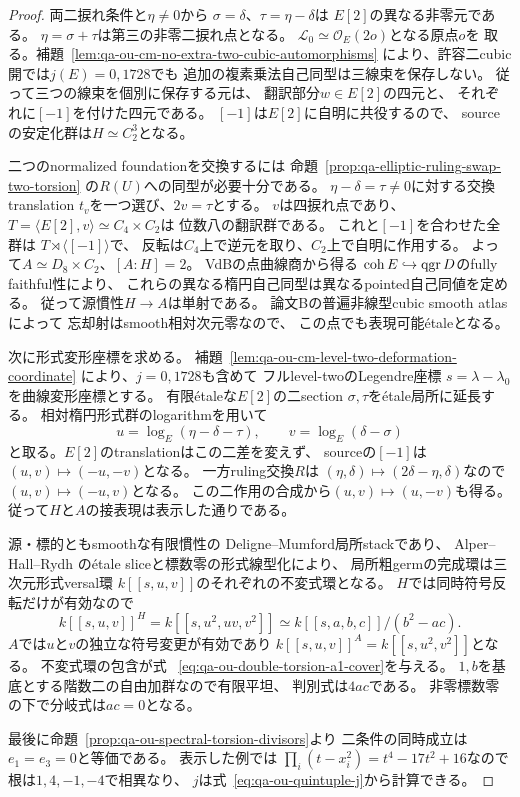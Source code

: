 \begin{proof}
両二捩れ条件と$\eta\ne0$から
$\sigma=\delta$、$\tau=\eta-\delta$は
$E[2]$の異なる非零元である。
$\eta=\sigma+\tau$は第三の非零二捩れ点となる。
$\mathcal L_0\simeq\mathcal O_E(2o)$となる原点$o$を
取る。補題~\ref{lem:qa-ou-cm-no-extra-two-cubic-automorphisms}
により、許容二cubic開では$j(E)=0,1728$でも
追加の複素乗法自己同型は三線束を保存しない。
従って三つの線束を個別に保存する元は、
翻訳部分$w\in E[2]$の四元と、
それぞれに$[-1]$を付けた四元である。
$[-1]$は$E[2]$に自明に共役するので、
sourceの安定化群は$H\simeq C_2^3$となる。

二つのnormalized foundationを交換するには
命題~\ref{prop:qa-elliptic-ruling-swap-two-torsion}
の$R(U)$への同型が必要十分である。
$\eta-\delta=\tau\ne0$に対する交換translation
$t_v$を一つ選び、$2v=\tau$とする。
$v$は四捩れ点であり、
$T=\langle E[2],v\rangle\simeq C_4\times C_2$は
位数八の翻訳群である。
これと$[-1]$を合わせた全群は
$T\rtimes\langle[-1]\rangle$で、
反転は$C_4$上で逆元を取り、$C_2$上で自明に作用する。
よって$A\simeq D_8\times C_2$、$[A:H]=2$。
VdBの点曲線商から得る
$\operatorname{coh} E\hookrightarrow\operatorname{qgr} D$のfully faithful性により、
これらの異なる楕円自己同型は異なるpointed自己同値を定める。
従って源慣性$H\to A$は単射である。
論文Bの普遍非線型cubic smooth atlasによって
忘却射はsmooth相対次元零なので、
この点でも表現可能étaleとなる。

次に形式変形座標を求める。
補題~\ref{lem:qa-ou-cm-level-two-deformation-coordinate}
により、$j=0,1728$も含めて
フルlevel-twoのLegendre座標
$s=\lambda-\lambda_0$を曲線変形座標とする。
有限étaleな$E[2]$の二section
$\sigma,\tau$をétale局所に延長する。
相対楕円形式群のlogarithmを用いて
\[
 u=\log_E(\eta-\delta-\tau),\qquad
 v=\log_E(\delta-\sigma)
\]
と取る。$E[2]$のtranslationはこの二差を変えず、
sourceの$[-1]$は$(u,v)\mapsto(-u,-v)$となる。
一方ruling交換$R$は
$(\eta,\delta)\mapsto(2\delta-\eta,\delta)$なので
$(u,v)\mapsto(-u,v)$となる。
この二作用の合成から$(u,v)\mapsto(u,-v)$も得る。
従って$H$と$A$の接表現は表示した通りである。

源・標的ともsmoothな有限慣性の
Deligne--Mumford局所stackであり、
Alper--Hall--Rydh
\cite[Theorem 1.2]{AlperHallRydh2020}
のétale sliceと標数零の形式線型化により、
局所粗germの完成環は三次元形式versal環
$k[[s,u,v]]$のそれぞれの不変式環となる。
$H$では同時符号反転だけが有効なので
\[
 k[[s,u,v]]^H
   =k[[s,u^2,uv,v^2]]
   \simeq k[[s,a,b,c]]/(b^2-ac).
\]
$A$では$u$と$v$の独立な符号変更が有効であり
$k[[s,u,v]]^A=k[[s,u^2,v^2]]$となる。
不変式環の包含が式
~\eqref{eq:qa-ou-double-torsion-a1-cover}を与える。
$1,b$を基底とする階数二の自由加群なので有限平坦、
判別式は$4ac$である。
非零標数零の下で分岐式は$ac=0$となる。

最後に命題~\ref{prop:qa-ou-spectral-torsion-divisors}より
二条件の同時成立は$e_1=e_3=0$と等価である。
表示した例では
$\prod_i(t-x_i^2)=t^4-17t^2+16$なので
根は$1,4,-1,-4$で相異なり、
$j$は式~\eqref{eq:qa-ou-quintuple-j}から計算できる。
\end{proof}

